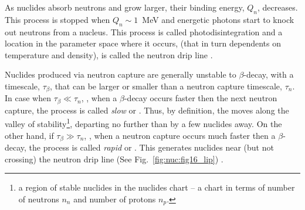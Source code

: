 %
%
%
%
As nuclides absorb neutrons and grow larger, their binding energy, $Q_n$, decreases. This process 
is stopped when $Q_n\sim1$~MeV and energetic photons start to knock out neutrons from a nucleus. 
This process is called photodisintegration and a location in the parameter space where it occurs, 
(that in turn dependents on temperature and density), is called the 
neutron drip line 
\citep{Rolfs:1988}.

Nuclides produced via neutron capture are generally unstable to $\beta$-decay, with a timescale, 
$\tau_{\beta}$, that can be larger or smaller than a neutron capture timescale, $\tau_n$. 
In case when $\tau_{\beta}\ll\tau_n$, \ie, when a $\beta$-decay occurs faster then the next 
neutron capture, the process is called \textit{slow} or \sproc{}. 
Thus, by definition, the \sproc{} moves along the valley of stability\footnote{
    a region of stable nuclides in the nuclides chart -- a chart in terms of number of neutrons $n_n$ 
    and number of protons $n_p$.
}, departing no further than by a few nuclides away.
On the other hand, if $\tau_{\beta}\gg\tau_n$, \ie, when a neutron capture occurs much faster then 
a $\beta$-decay, the process is called \textit{rapid} or \rproc{}. This \nuc{} generates nuclides 
near (but not crossing) the neutron drip line (See Fig.~\ref{fig:nuc:fig16_lip}) \citep{Rolfs:1988}. 

